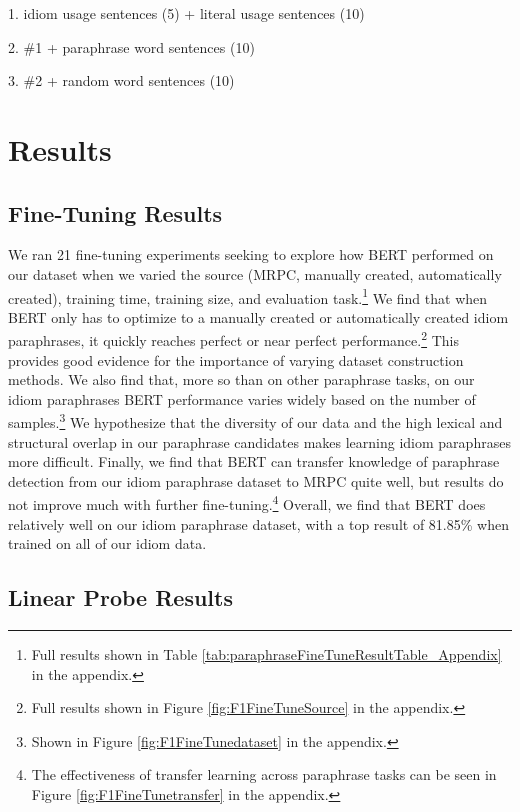 \documentclass[11pt,a4paper]{article}
\begin{document}
1. idiom usage sentences (5) + literal usage sentences (10)

2. \#1 + paraphrase word sentences (10)

3. \#2 + random word sentences (10)

\section{Results}
\subsection{Fine-Tuning Results}
We ran 21 fine-tuning experiments seeking to explore how BERT performed on our dataset when we varied the source (MRPC, manually created, automatically created), training time, training size, and evaluation task.\footnote{Full results shown in Table \ref{tab:paraphraseFineTuneResultTable_Appendix} in the appendix.} We find that when BERT only has to optimize to a manually created or automatically created idiom paraphrases, it quickly reaches perfect or near perfect performance.\footnote{Full results shown in Figure \ref{fig:F1FineTuneSource} in the appendix.} This provides good evidence for the importance of varying dataset construction methods. We also find that, more so than on other paraphrase tasks, on our idiom paraphrases BERT performance varies widely based on the number of samples.\footnote{Shown in Figure \ref{fig:F1FineTunedataset} in the appendix.} We hypothesize that the diversity of our data and the high lexical and structural overlap in our paraphrase candidates makes learning idiom paraphrases more difficult. Finally, we find that BERT can transfer knowledge of paraphrase detection from our idiom paraphrase dataset to MRPC quite well, but results do not improve much with further fine-tuning.\footnote{The effectiveness of transfer learning across paraphrase tasks can be seen in Figure \ref{fig:F1FineTunetransfer} in the appendix.} Overall, we find that BERT does relatively well on our idiom paraphrase dataset, with a top result of 81.85\% when trained on all of our idiom data. 

\subsection{Linear Probe Results}
\end{document}
